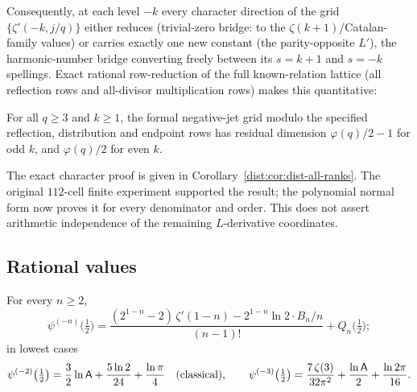 Consequently, at each level $-k$ every character direction of the grid
$\{\zeta'(-k,j/q)\}$ either reduces (trivial-zero bridge: to the
$\zeta(k+1)$/Catalan-family values) or carries exactly one new constant
(the parity-opposite $L'$), the harmonic-number bridge converting freely
between its $s=k+1$ and $s=-k$ spellings. Exact rational row-reduction of
the full known-relation lattice (all reflection rows and all-divisor
multiplication rows) makes this quantitative:

\begin{corollary}\label{stieltjes:prop:jetrank}
For all $q\ge3$ and $k\ge1$, the formal negative-jet grid modulo the
specified reflection, distribution and endpoint rows has residual
dimension $\varphi(q)/2-1$ for odd $k$, and $\varphi(q)/2$ for even $k$.
\end{corollary}
The exact character proof is given in
Corollary~\ref{dist:cor:dist-all-ranks}. The original $112$-cell finite
experiment supported the result; the polynomial normal form now proves
it for every denominator and order. This does not assert arithmetic
independence of the remaining $L$-derivative coordinates.

\subsection{Rational values}\label{stieltjes:sec:negvalues}

\begin{theorem}\label{stieltjes:thm:neghalf}
For every $n\ge2$,
\[
\psi^{(-n)}\bigl(\tfrac12\bigr)
=\frac{(2^{1-n}-2)\,\zeta'(1-n)-2^{1-n}\ln2\cdot B_n/n}{(n-1)!}
+Q_n\bigl(\tfrac12\bigr);
\]
in lowest cases
\[
\psi^{(-2)}\bigl(\tfrac12\bigr)
=\frac32\ln\mathsf{A}+\frac{5\ln2}{24}+\frac{\ln\pi}{4}
\quad\text{(classical)},\qquad
\psi^{(-3)}\bigl(\tfrac12\bigr)
=\frac{7\,\zeta(3)}{32\pi^2}+\frac{\ln\mathsf{A}}{2}+\frac{\ln2\pi}{16}.
\]
\end{theorem}

